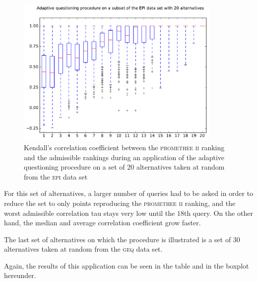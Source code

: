 \begin{figure}[!h]
    \centering
    \includegraphics[width=0.88\textwidth]{referenced_promethee/src/boxplot_epi_seed_0.pdf}
    \caption{Kendall's correlation coefficient between the \textsc{promethee ii} ranking and the admissible rankings during an application of the adaptive questioning procedure on a set of 20 alternatives taken at random from the \textsc{epi} data set}
    \label{fig:boxplot_epi_seed_0}
\end{figure}

For this set of alternatives, a larger number of queries had to be asked in order to reduce the set to only points reproducing the \textsc{promethee ii} ranking, and the worst admissible correlation tau stays very low until the $18$th query. On the other hand, the median and average correlation coefficient grow faster.


The last set of alternatives on which the procedure is illustrated is a set of 30 alternatives taken at random from the \textsc{geq} data set.

Again, the results of this application can be seen in the table and in the boxplot hereunder.

